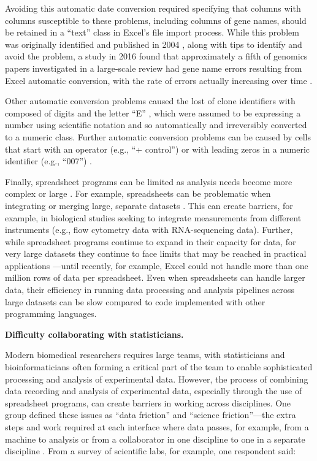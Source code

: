 \documentclass[]{tufte-book}
\begin{document}
Avoiding this automatic date conversion required specifying that columns with
columns susceptible to these problems, including columns of gene names, should
be retained in a ``text'' class in Excel's file import process. While this
problem was originally identified and published in 2004 \citep{zeeberg2004mistaken},
along with tips to identify and avoid the problem, a study in 2016 found that
approximately a fifth of genomics papers investigated in a large-scale review
had gene name errors resulting from Excel automatic conversion, with the rate of
errors actually increasing over time \citep{ziemann2016gene}.

Other automatic conversion problems caused the lost of clone identifiers with
composed of digits and the letter ``E'' \citep{zeeberg2004mistaken, welsh2017escape},
which were assumed to be expressing a number using scientific notation and so
automatically and irreversibly converted to a numeric class. Further automatic
conversion problems can be caused by cells that start with an operator (e.g., ``+
control'') or with leading zeros in a numeric identifier (e.g., ``007'')
\citep{welsh2017escape}.

Finally, spreadsheet programs can be limited as analysis needs become more
complex or large \citep{topaloglou2004biological}. For example, spreadsheets can be
problematic when integrating or merging large, separate datasets
\citep{birch2018future}. This can create barriers, for example, in biological studies
seeking to integrate measurements from different instruments (e.g., flow
cytometry data with RNA-sequencing data). Further, while spreadsheet programs
continue to expand in their capacity for data, for very large datasets they
continue to face limits that may be reached in practical applications
\citep{birch2018future}---until recently, for example, Excel could not handle more
than one million rows of data per spreadsheet. Even when spreadsheets can handle
larger data, their efficiency in running data processing and analysis pipelines
across large datasets can be slow compared to code implemented with other
programming languages.

\textbf{Difficulty collaborating with statisticians.}

Modern biomedical researchers requires large teams, with statisticians and
bioinformaticians often forming a critical part of the team to enable
sophisticated processing and analysis of experimental data. However, the process
of combining data recording and analysis of experimental data, especially
through the use of spreadsheet programs, can create barriers in working across
disciplines. One group defined these issues as ``data friction'' and ``science
friction''---the extra steps and work required at each interface where data
passes, for example, from a machine to analysis or from a collaborator in one
discipline to one in a separate discipline \citep{edwards2011science}.
From a survey of scientific labs, for example, one respondent said:
\end{document}
